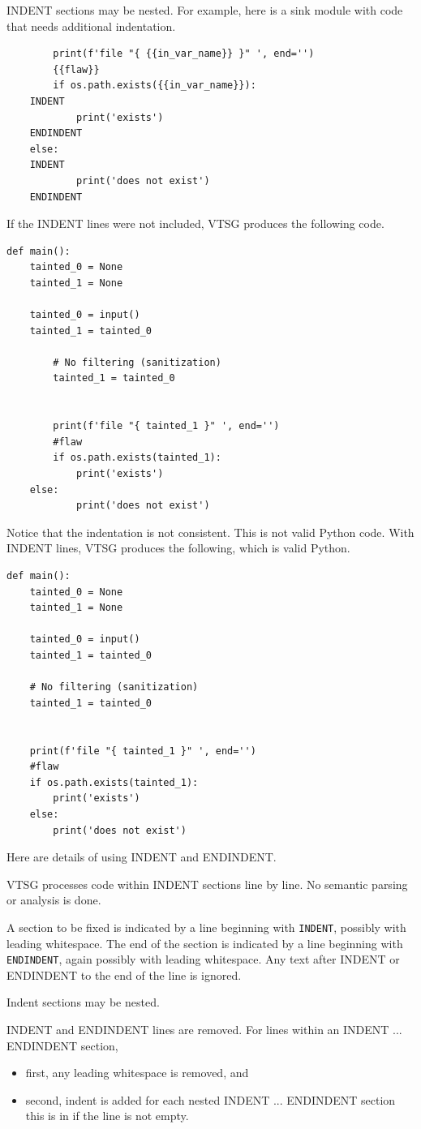 \documentclass[12pt]{article}
\begin{document}
INDENT sections may be nested.  For example, here is a sink module with code that
needs additional indentation.
\begin{verbatim}
        print(f'file "{ {{in_var_name}} }" ', end='')
        {{flaw}}
        if os.path.exists({{in_var_name}}):
	INDENT
            print('exists')
	ENDINDENT
	else:
	INDENT
            print('does not exist')
	ENDINDENT
\end{verbatim}
If the INDENT lines were not included, VTSG produces the following code.
\begin{verbatim}
def main():
    tainted_0 = None
    tainted_1 = None

    tainted_0 = input()
    tainted_1 = tainted_0
    
        # No filtering (sanitization)
        tainted_1 = tainted_0
            
    
        print(f'file "{ tainted_1 }" ', end='')
        #flaw
        if os.path.exists(tainted_1):
            print('exists')
	else:
            print('does not exist')
\end{verbatim}
Notice that the indentation is not consistent. This is not valid Python code.
With INDENT lines, VTSG produces the following, which is valid Python.
\begin{verbatim}
def main():
    tainted_0 = None
    tainted_1 = None

    tainted_0 = input()
    tainted_1 = tainted_0

    # No filtering (sanitization)
    tainted_1 = tainted_0


    print(f'file "{ tainted_1 }" ', end='')
    #flaw
    if os.path.exists(tainted_1):
        print('exists')
    else:
        print('does not exist')
\end{verbatim}

Here are details of using INDENT and ENDINDENT.

VTSG processes code within INDENT sections line by line. No semantic parsing or
analysis is done.

A section to be fixed is indicated by a line beginning with \verb|INDENT|, possibly
with leading whitespace. The end of the section is indicated by a line beginning with
\verb|ENDINDENT|, again possibly with leading whitespace. Any text after INDENT or
ENDINDENT to the end of the line is ignored.

Indent sections may be nested.

INDENT and ENDINDENT lines are removed.
For lines within an INDENT ... ENDINDENT section,
\begin{itemize}
\item first, any leading whitespace is removed, and
\item second, indent is added for each nested INDENT ... ENDINDENT section this
  is in if the line is not empty.
\end{itemize}
\end{document}
